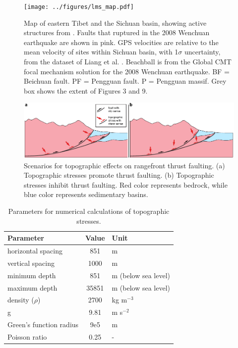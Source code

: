 \documentclass[draft,jgrga]{AGUTeX}
\begin{document}
\begin{figure}[ht!] \texttt{[image: ../figures/lms\_map.pdf]}
    \caption{Map of eastern Tibet and the Sichuan basin, showing active
        structures from \citet{styron2010}. Faults that ruptured in the 2008
        Wenchuan earthquake are shown in pink. GPS velocities are relative to
        the mean velocity of sites within Sichuan basin, with 1$\sigma$
        uncertainty, from the dataset of Liang et al.  \citet{liang2013}.
        Beachball is from the Global CMT focal mechanism solution for the 2008
    Wenchuan earthquake. BF = Beichuan fault. PF = Pengguan fault. P = Pengguan
massif. Grey box shows the extent of Figures 3 and 9.} \label{fig:lms_map}
\end{figure}

\begin{figure}[t!] \centering
    \includegraphics[width=40pc]{../figures/topo_stress_possibilities.pdf}
    \caption{Scenarios for topographic effects on rangefront thrust faulting.
        (a) Topographic stresses promote thrust faulting. (b) Topographic
        stresses inhibit thrust faulting. Red color represents bedrock, while
        blue color represents sedimentary basins.} 
\label{fig:topo_fault_scenarios}
\end{figure}


\begin{table}
\centering
\begin{tabular}{l c l}
\hline
Parameter & Value & Unit \\
\hline
horizontal spacing & 851 & m \\ 
vertical spacing & 1000 & m \\ 
minimum depth & 851 & m (below sea level) \\ 
maximum depth & 35851 & m (below sea level) \\ 
density ($\rho$) & 2700 & kg m$^{-3}$ \\ 
g & 9.81 & m s$^{-2}$ \\ 
Green's function radius & 9e5 & m \\ 
Poisson ratio & 0.25 & - \\ 
\hline
\end{tabular}
\caption{Parameters for numerical calculations of topographic stresses.}
\label{table:convo_params}
\end{table}
\end{document}
